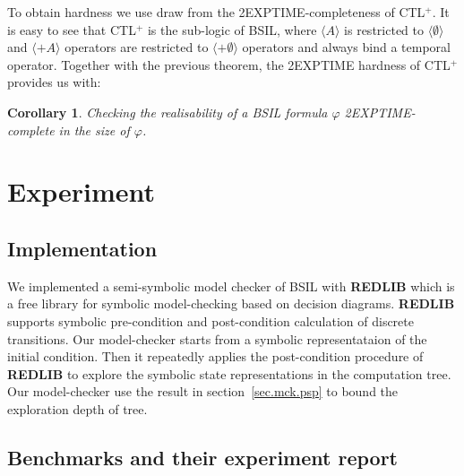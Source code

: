 \documentclass[11pt]{article}
\newtheorem{corollary}[theorem]{Corollary}
\begin{document}
To obtain hardness we use draw from the 2EXPTIME-completeness of CTL$^+$.
It is easy to see that CTL${}^+$ is the sub-logic of BSIL, where $\langle A \rangle$ is restricted to $\langle \emptyset \rangle$ and $\langle+A \rangle$ operators are restricted to $\langle+\emptyset \rangle$ operators and always bind a temporal operator.
Together with the previous theorem, the 2EXPTIME hardness of CTL$^+$ \cite{} provides us with:

\begin{corollary}
Checking the realisability of a BSIL formula $\varphi$ 2EXPTIME-complete in the size of $\varphi$.
\end{corollary}



\section{Experiment \label{sec.expe}}

\subsection{Implementation} 

We implemented a semi-symbolic model checker of BSIL with {\bf REDLIB} 
\cite{Wang03,Wang08a,Wang08b,Wang13,Wang14}
which is a free library for symbolic model-checking based on decision diagrams. 
{\bf REDLIB} supports symbolic pre-condition and post-condition calculation 
of discrete transitions.  
Our model-checker starts from a symbolic representataion of the initial 
condition. 
Then it repeatedly applies the post-condition procedure of {\bf REDLIB}
to explore the symbolic state representations in the computation tree.  
Our model-checker use the result in section~\ref{sec.mck.psp} to bound 
the exploration depth of tree.   

\subsection{Benchmarks and their experiment report} 
\end{document}
